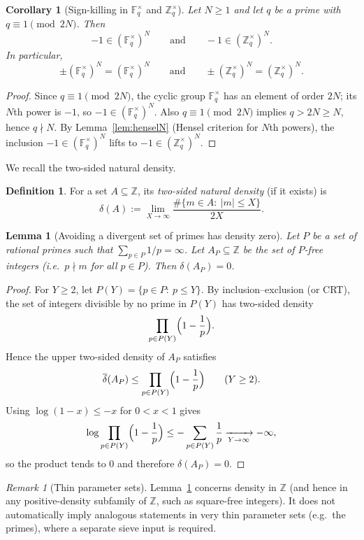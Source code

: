 \documentclass[11pt,letterpaper]{amsart}
\newcommand{\Z}{\mathbb{Z}}
\newcommand{\F}{\mathbb{F}}
\theoremstyle{plain}
\newtheorem{lemma}[theorem]{Lemma}
\newtheorem{corollary}[theorem]{Corollary}
\theoremstyle{definition}
\newtheorem{definition}[theorem]{Definition}
\theoremstyle{remark}
\newtheorem{remark}[theorem]{Remark}
\theoremstyle{plain}
\begin{document}
\begin{corollary}[Sign-killing in $\F_q^\times$ and $\Z_q^\times$]
\label{cor:sign-killed}
Let $N\ge 1$ and let $q$ be a prime with $q\equiv 1\pmod{2N}$. Then
\[
-1\in(\F_q^\times)^N
\qquad\text{and}\qquad
-1\in(\Z_q^\times)^N.
\]
In particular,
\[
\pm(\F_q^\times)^N=(\F_q^\times)^N
\qquad\text{and}\qquad
\pm(\Z_q^\times)^N=(\Z_q^\times)^N.
\]
\end{corollary}

\begin{proof}
Since $q\equiv 1\pmod{2N}$, the cyclic group $\F_q^\times$ has an element of order $2N$; its $N$th power is $-1$,
so $-1\in(\F_q^\times)^N$.
Also $q\equiv 1\pmod{2N}$ implies $q>2N\ge N$, hence $q\nmid N$.
By Lemma~\ref{lem:henselN} (Hensel criterion for $N$th powers), the inclusion
$-1\in(\F_q^\times)^N$ lifts to $-1\in(\Z_q^\times)^N$.
\end{proof}

We recall the two-sided natural density.
\begin{definition}
\label{def:two-sided-density}
For a set $A\subseteq \Z$, its \emph{two-sided natural density} (if it exists) is
\[
\delta(A):=\lim_{X\to\infty}\frac{\#\{m\in A:\ |m|\le X\}}{2X}.
\]
\end{definition}

\begin{lemma}[Avoiding a divergent set of primes has density zero]
\label{lem:avoid-divergent-P}
Let $P$ be a set of rational primes such that $\sum_{p\in P}1/p=\infty$.
Let $A_P\subseteq \Z$ be the set of \emph{$P$-free} integers (i.e.\ $p\nmid m$ for all $p\in P$).
Then $\delta(A_P)=0$.
\end{lemma}

\begin{proof}
For $Y\ge 2$, let $P(Y)=\{p\in P:\ p\le Y\}$.
By inclusion--exclusion (or CRT), the set of integers divisible by no prime in $P(Y)$ has two-sided density
\[
\prod_{p\in P(Y)}\Bigl(1-\frac{1}{p}\Bigr).
\]
Hence the upper two-sided density of $A_P$ satisfies
\[
\overline{\delta}(A_P)\le \prod_{p\in P(Y)}\Bigl(1-\frac{1}{p}\Bigr)\qquad(Y\ge 2).
\]
Using $\log(1-x)\le -x$ for $0<x<1$ gives
\[
\log\prod_{p\in P(Y)}\Bigl(1-\frac{1}{p}\Bigr)\le -\sum_{p\in P(Y)}\frac{1}{p}\xrightarrow[Y\to\infty]{}-\infty,
\]
so the product tends to $0$ and therefore $\delta(A_P)=0$.
\end{proof}

\begin{remark}[Thin parameter sets]
Lemma~\ref{lem:avoid-divergent-P} concerns density in $\Z$ (and hence in any positive-density subfamily of $\Z$,
such as square-free integers). It does not automatically imply analogous statements in very thin parameter sets
(e.g.\ the primes), where a separate sieve input is required.
\end{remark}
\end{document}
